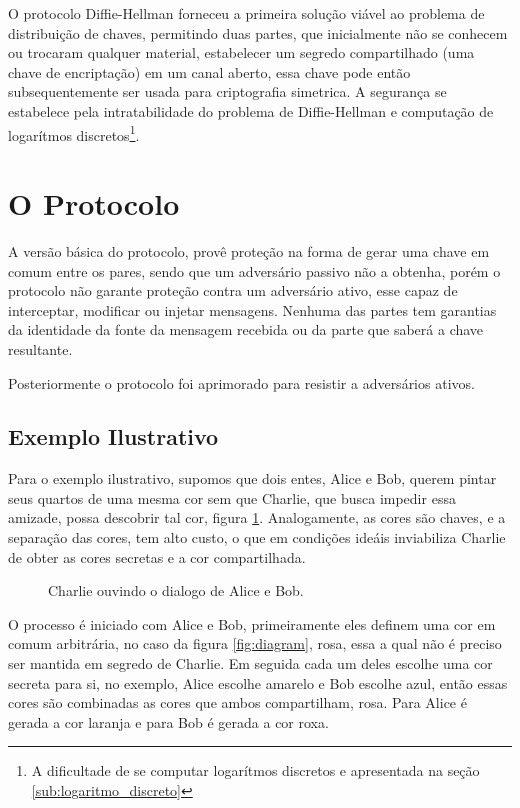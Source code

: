 \documentclass{article}
\begin{document}
O protocolo Diffie-Hellman forneceu a primeira solução viável ao problema
de distribuição de chaves, permitindo duas partes, que inicialmente não se
conhecem ou trocaram qualquer material, estabelecer um segredo compartilhado
(uma chave de encriptação) em um canal aberto, essa chave pode então
subsequentemente ser usada para criptografia simetrica. A segurança se
estabelece pela intratabilidade do problema de
Diffie-Hellman\cite{katz1996handbook} e computação de logarítmos
discretos\footnote{A dificultade de se computar logarítmos discretos e
apresentada na seção \ref{sub:logaritmo_discreto}}.

\section{O Protocolo}%
\label{sec:o_protocolo}

A versão básica do protocolo, provê proteção na forma de gerar uma
chave em comum entre os pares, sendo que um adversário passivo não a obtenha,
porém o protocolo não garante proteção contra um adversário ativo, esse capaz
de interceptar, modificar ou injetar mensagens. Nenhuma das partes tem
garantias da identidade da fonte da mensagem recebida ou da parte que saberá
a chave resultante\cite{katz1996handbook}.

Posteriormente o protocolo foi aprimorado para resistir a adversários ativos.

\subsection{Exemplo Ilustrativo}%
\label{sub:exemplo_ilustrativo}
Para o exemplo ilustrativo, supomos que dois entes, Alice e Bob, querem pintar
seus quartos de uma mesma cor sem que Charlie, que busca impedir essa amizade,
possa descobrir tal cor, figura \ref{fig:abc}. Analogamente, as cores são
chaves, e a separação das cores, tem alto custo, o que em condições ideáis
inviabiliza Charlie de obter as cores secretas e a cor compartilhada.

\begin{figure}[htpb]
    \centering
    
    \caption{Charlie ouvindo o dialogo de Alice e Bob.}%
    \label{fig:abc}
\end{figure}

O processo é iniciado com Alice e Bob, primeiramente eles definem
uma cor em comum arbitrária, no caso da figura \ref{fig:diagram}, rosa, essa
a qual não é preciso ser mantida em segredo de Charlie. Em seguida cada um deles
escolhe uma cor secreta para si, no exemplo, Alice escolhe amarelo e Bob
escolhe azul, então essas cores são combinadas as cores que ambos compartilham,
rosa. Para Alice é gerada a cor laranja e para Bob é gerada a cor roxa.
\end{document}
